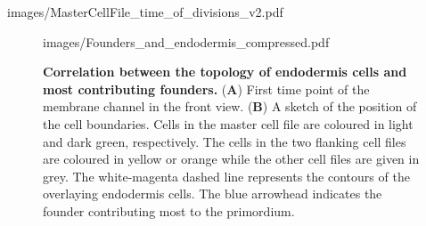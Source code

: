 \documentclass[11pt,a4paper, final]{article}
\begin{document}
%
\begin{sidewaysfigure}[htbp]
\centering
	\begin{overpic}[width=1.\linewidth]{images/MasterCellFile_time_of_divisions_v2.pdf}
	\end{overpic}
\caption[Timing of each division per cell file.]
{{\bf Timing of each division per cell file.} For each indicated round of division (sub panels cycle 1$, \ldots$ Cycle 6), each cell division is plotted according to its cell file location and its time of occurrence (since the first division). The dashed box indicates the master cell file. All datasets are considered.
}
	\label{fig:mastertimediv}
\end{sidewaysfigure}
%
\clearpage
%
\begin{figure}[htbp]
\centering
	\begin{overpic}[width=0.5\linewidth]{images/Founders_and_endodermis_compressed.pdf}
	\end{overpic}
\caption[Correlation between the topology of endodermis cells and most contributing founders.]
{{\bf Correlation between the topology of endodermis cells and most contributing founders.} (\textbf{A}) First time point of the membrane channel in the front view. (\textbf{B}) A sketch of the position of the cell boundaries. Cells in the master cell file are coloured in light and dark green, respectively. The cells in the two flanking cell files are coloured in yellow or orange while the other cell files are given in grey. The white-magenta dashed line represents the contours of the overlaying endodermis cells. The blue arrowhead indicates the founder contributing most to the primordium.}
	\label{fig:foundersendo}
\end{figure}
%
\clearpage
\end{document}
